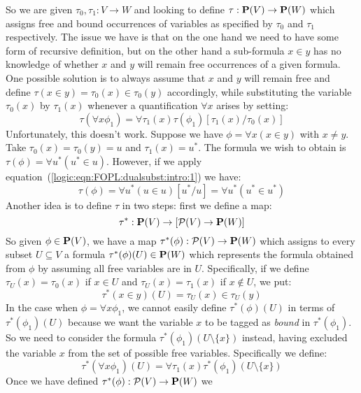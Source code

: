 So we are given $\tau_{0},\tau_{1}:V\to W$ and looking to define
$\tau:\mbox{${\bf P}(V)$}\to{\bf P}(W)$ which assigns free and bound occurrences of
variables as specified by $\tau_{0}$ and $\tau_{1}$ respectively.
The issue we have is that on the one hand we need to have some form
of recursive definition, but on the other hand a sub-formula $x\in
y$ has no knowledge of whether $x$ and $y$ will remain free
occurrences of a given formula. One possible solution is to always
assume that $x$ and $y$ will remain free and define $\tau(x\in
y)=\tau_{0}(x)\in\tau_{0}(y)$ accordingly, while substituting the
variable $\tau_{0}(x)$ by $\tau_{1}(x)$ whenever a quantification
$\forall x$ arises by setting:
     \begin{equation}\label{logic:eqn:FOPL:dualsubst:intro:1}
     \tau(\forall
     x\phi_{1})=\forall\tau_{1}(x)\tau(\phi_{1})[\tau_{1}(x)/\tau_{0}(x)]
    \end{equation}
Unfortunately, this doesn't work. Suppose we have $\phi=\forall
x(x\in y)$ with $x\neq y$. Take $\tau_{0}(x)=\tau_{0}(y)=u$ and
$\tau_{1}(x)=u^{*}$. The formula we wish to obtain is
$\tau(\phi)=\forall u^{*}(u^{*}\in u)$. However, if we apply
equation~(\ref{logic:eqn:FOPL:dualsubst:intro:1}) we have:
    \[
    \tau(\phi)=\forall u^{*}(u\in u)[u^{*}/u]=\forall u^{*}(u^{*}\in
    u^{*})
    \]
Another idea is to define $\tau$ in two steps: first we define a
map:
    \[
    \tau^{*}:\mbox{${\bf P}(V)$}\to[{\cal P}(V)\to{\bf P}(W)]
    \]
So given $\phi\in\mbox{${\bf P}(V)$}$, we have a map $\tau^{*}(\phi):{\cal
P}(V)\to{\bf P}(W)$ which assigns to every subset $U\subseteq V$ a
formula $\tau^{*}(\phi)(U)\in{\bf P}(W)$ which represents the
formula obtained from $\phi$ by assuming all free variables are in
$U$. Specifically, if we define $\tau_{U}(x)=\tau_{0}(x)$ if $x\in
U$ and $\tau_{U}(x)=\tau_{1}(x)$ if $x\not\in U$, we put:
    \[
    \tau^{*}(x\in y)(U) = \tau_{U}(x)\in\tau_{U}(y)
    \]
In the case when $\phi=\forall x\phi_{1}$, we cannot easily define
$\tau^{*}(\phi)(U)$ in terms of $\tau^{*}(\phi_{1})(U)$ because we
want the variable $x$ to be tagged as {\em bound} in
$\tau^{*}(\phi_{1})$. So we need to consider the formula
$\tau^{*}(\phi_{1})(U\setminus\{x\})$ instead, having excluded the
variable $x$ from the set of possible free variables. Specifically
we define:
    \begin{equation}\label{logic:eqn:FOPL:dualsubst:intro:2}
    \tau^{*}(\forall
    x\phi_{1})(U)=\forall\tau_{1}(x)\tau^{*}(\phi_{1})(U\setminus\{x\})
    \end{equation}
Once we have defined $\tau^{*}(\phi):{\cal P}(V)\to{\bf P}(W)$ we
